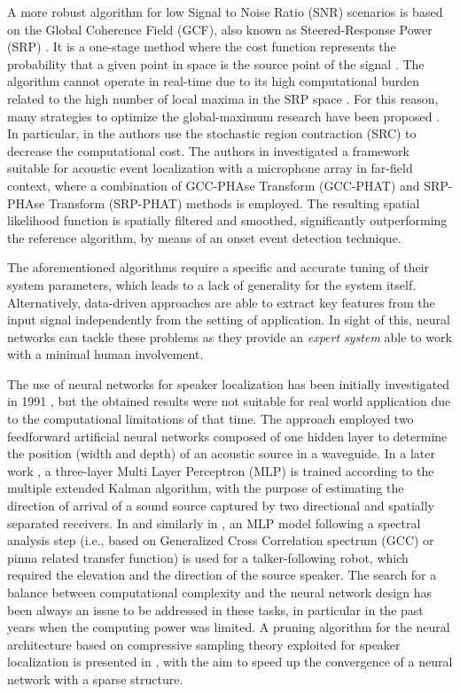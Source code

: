 \documentclass[review]{elsarticle}
\begin{document}
A more robust algorithm for low Signal to Noise Ratio (SNR) scenarios is based on the Global Coherence Field (GCF), also known as Steered-Response Power (SRP) \cite{brandstein1997robust}. It is a one-stage method where the cost function represents the probability that a given point in space is the source point of the signal \cite{brutti2007classification}. The algorithm cannot operate in real-time due to its high computational burden related to the high number of local maxima in the SRP space \cite{yook2016fast}. For this reason, many strategies to optimize the global-maximum research have been proposed \cite{DoSY07,Minotto2012,Lee2016}. In particular, in \cite{DoSY07} the authors use the stochastic region contraction (SRC) to decrease the computational cost. The authors in \cite{transfeld2015acoustic} investigated a framework  suitable for acoustic event localization with a microphone array in far-field context, where a combination of GCC-PHAse Transform (GCC-PHAT) and SRP-PHAse Transform (SRP-PHAT) methods is employed. The resulting spatial likelihood function is spatially filtered and smoothed, significantly outperforming the reference algorithm, by means of an onset event detection technique. 

The aforementioned algorithms require a specific and accurate tuning of their system parameters, which leads to a lack of generality for the system itself. Alternatively, data-driven approaches are able to extract key features from the input signal independently from the setting of application. In sight of this, neural networks can tackle these problems as they provide an \textit{expert system} able to work with a minimal human involvement. 

The use of neural networks for speaker localization has been initially investigated in 1991 \cite{zakarauskas1991artificial}, but the obtained results were not suitable for real world application due to the computational limitations of that time. The approach employed two feedforward artificial neural networks composed of one hidden layer to determine the position (width and depth) of an acoustic source in a waveguide.  In a later work \cite{datum1996artificial}, a three-layer Multi Layer Perceptron (MLP) is trained according to the multiple extended Kalman algorithm, with the purpose of estimating the direction of arrival of a sound source captured by two directional and spatially separated receivers. In \cite{Mumolo200369} and similarly in \cite{murray2011neural}, an MLP model following a spectral analysis step (i.e., based on Generalized Cross Correlation spectrum (GCC) or pinna related transfer function) is used for a talker-following robot, which required the elevation and the direction of the source speaker. The search for a balance between computational complexity and the neural network design has been always an issue to be addressed in these tasks, in particular in the past years when the computing power was limited.  A pruning algorithm for the neural architecture based on compressive sampling theory exploited for speaker localization is presented in \cite{dehkordi2011compressive}, with the aim to speed up the convergence of a neural network with a sparse structure. 
\end{document}

